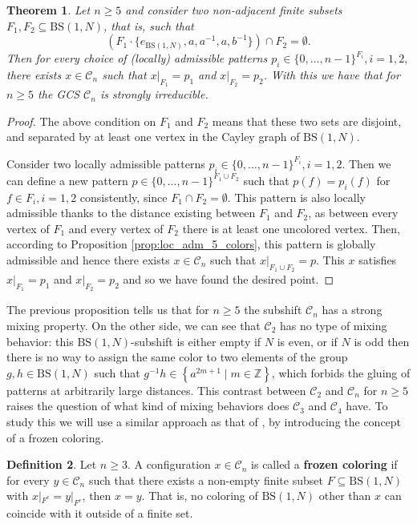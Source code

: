 \documentclass{aims}
\newcommand{\BS}[1][N]{\mathrm{BS}(1,#1)}
\newtheorem{theorem}{Theorem}[section]
\theoremstyle{definition}
\newtheorem{definition}[theorem]{Definition}
\begin{document}
\begin{theorem}\label{thm:gcs_mixing_n5} Let $n\ge 5$ and consider two non-adjacent finite subsets $F_1,F_2\subseteq \BS$, that is, such that 
	$$\left( F_1\cdot \{e_{\BS},a,a^{-1},a,b^{-1}\}\right)\cap F_2=\emptyset.$$
	Then for every choice of (locally) admissible patterns $p_i\in \{0,\ldots,n-1\}^{F_i}, i=1,2,$ there exists $x\in \mathcal{C}_n$ such that $x|_{F_1}=p_1$ and $x|_{F_2}=p_2$. With this we have that for $n\ge 5$ the GCS $\mathcal{C}_n$ is strongly irreducible.
\end{theorem}
\begin{proof}
	The above condition on $F_1$ and $F_2$ means that these two sets are disjoint, and separated by at least one vertex in the Cayley graph of $\BS$. 
	
	Consider two locally admissible patterns $p_i\in \{0,\ldots,n-1\}^{F_i}, i=1,2$. Then we can define a new pattern $p\in \{0,\ldots,n-1\}^{F_1\cup F_2}$ such that $p(f)=p_i(f)$ for $f\in F_i, i=1,2$ consistently, since $F_1\cap F_2=\emptyset.$ This pattern is also locally admissible thanks to the distance existing between $F_1$ and $F_2$, as between every vertex of $F_1$ and every vertex of $F_2$ there is at least one uncolored vertex. Then, according to Proposition \ref{prop:loc_adm_5_colors}, this pattern is globally admissible and hence there exists $x\in \mathcal{C}_n$ such that $x|_{F_1\cup F_2}=p$. This $x$ satisfies $x|_{F_1}=p_1$ and $x|_{F_2}=p_2$ and so we have found the desired point.
\end{proof}


The previous proposition tells us that for $n\ge 5$ the subshift $\mathcal{C}_n$ has a strong mixing property. On the other side, we can see that $\mathcal{C}_2$ has no type of mixing behavior: this $\BS$-subshift is either empty if $N$ is even, or if $N$ is odd then there is no way to assign the same color to two elements of the group $g,h\in \BS$ such that $g^{-1}h\in \left\{a^{2m+1}\mid m\in \mathbb{Z} \right\}$, which forbids the gluing of patterns at arbitrarily large distances. This contrast between $\mathcal{C}_2$ and $\mathcal{C}_n$ for $n\ge 5$ raises the question of what kind of mixing behaviors does $\mathcal{C}_3$ and $\mathcal{C}_4$ have. To study this we will use a similar approach as that of \cite{alon2019mixing}, by introducing the concept of a frozen coloring.
\begin{definition} Let $n\ge 3$. A configuration $x\in \mathcal{C}_n$ is called a \textbf{frozen coloring} if for every $y\in \mathcal{C}_n$ such that there exists a non-empty finite subset $F\subseteq \BS$ with $x|_{F^c}=y|_{F^c}$, then $x= y$. That is, no coloring of $\BS$ other than $x$ can coincide with it outside of a finite set.
\end{definition}
\end{document}
